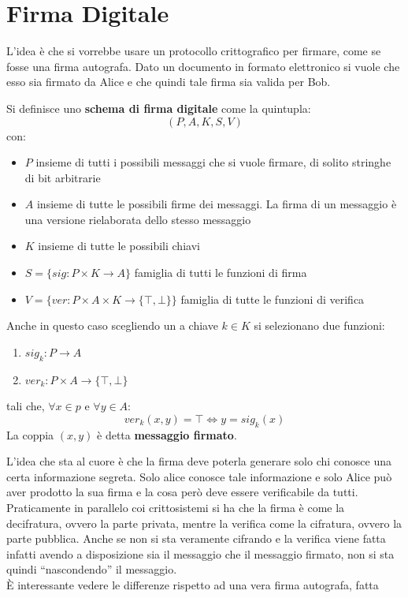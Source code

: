 \documentclass[a4paper,12pt, oneside]{book}
\begin{document}
\section{Firma Digitale}
L'idea è che si vorrebbe usare un protocollo crittografico per firmare, come se
fosse una firma autografa. Dato un documento in formato elettronico si vuole che
esso sia firmato da Alice e che quindi tale firma sia valida per Bob.
\begin{definizione}
  Si definisce uno \textbf{schema di firma digitale} come la quintupla:
  \[(P,A,K,S,V)\]
  con:
  \begin{itemize}
    \item $P$ insieme di tutti i possibili messaggi che si vuole firmare, di
    solito stringhe di bit arbitrarie
    \item $A$ insieme di tutte le possibili firme dei messaggi. La firma di un
    messaggio è una versione rielaborata dello stesso messaggio
    \item $K$ insieme di tutte le possibili chiavi
    \item $S=\{sig:P\times K\to A\}$ famiglia di tutti le funzioni di firma
    \item $V=\{ver:P\times A\times K\to\{\top,\bot\}\}$ famiglia di tutte le
    funzioni di verifica
  \end{itemize}
  Anche in questo caso scegliendo un a chiave $k\in K$ si selezionano due
  funzioni:
  \begin{enumerate}
    \item $sig_k:P\to A$
    \item $ver_k:P\times A\to\{\top,\bot\}$
  \end{enumerate}
  tali che, $\forall x\in p$ e $\forall y\in A$:
  \[ver_k(x,y)=\top \iff y=sig_k(x)\]
  La coppia $(x,y)$ è detta \textbf{messaggio firmato}.
\end{definizione}
L'idea che sta al cuore è che la firma deve poterla generare solo chi conosce
una certa informazione segreta. Solo alice conosce tale informazione e solo
Alice può aver prodotto la sua firma e la cosa però deve essere verificabile da
tutti. Praticamente in parallelo coi crittosistemi si ha che la firma è come la
decifratura, ovvero la parte privata, mentre la verifica come la cifratura,
ovvero la parte pubblica. Anche se non si sta veramente cifrando e la verifica
viene fatta infatti avendo a disposizione sia il messaggio che il messaggio
firmato, non si sta quindi ``nascondendo'' il messaggio.\\  
È interessante vedere le differenze rispetto ad una vera firma autografa, fatta
\end{document}
